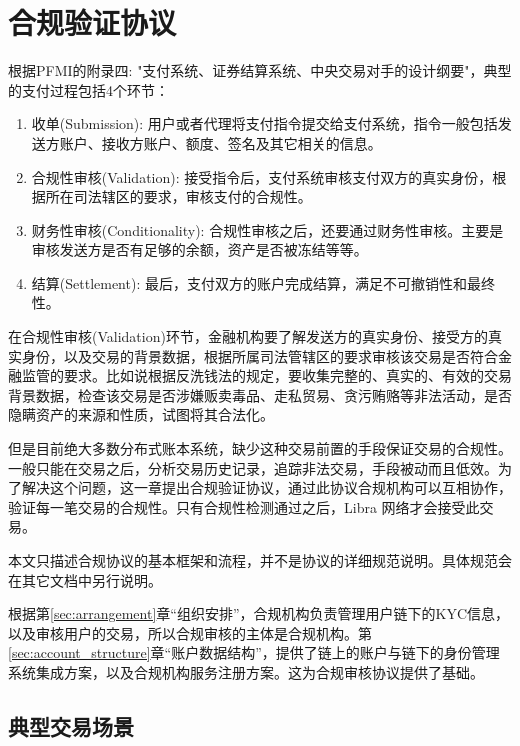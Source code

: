 \section{合规验证协议}\label{sec:compliance}
根据PFMI\cite{pfmi}的附录四: "支付系统、证券结算系统、中央交易对手的设计纲要"，典型的支付过程包括4个环节：
\begin{enumerate}
    \item 收单(Submission): 用户或者代理将支付指令提交给支付系统，指令一般包括发送方账户、接收方账户、额度、签名及其它相关的信息。
    \item 合规性审核(Validation): 接受指令后，支付系统审核支付双方的真实身份，根据所在司法辖区的要求，审核支付的合规性。
    \item 财务性审核(Conditionality): 合规性审核之后，还要通过财务性审核。主要是审核发送方是否有足够的余额，资产是否被冻结等等。
    \item 结算(Settlement): 最后，支付双方的账户完成结算，满足不可撤销性和最终性。
\end{enumerate}

在合规性审核(Validation)环节，金融机构要了解发送方的真实身份、接受方的真实身份，以及交易的背景数据，根据所属司法管辖区的要求审核该交易是否符合金融监管的要求。比如说根据反洗钱法的规定，要收集完整的、真实的、有效的交易背景数据，检查该交易是否涉嫌贩卖毒品、走私贸易、贪污贿赂等非法活动，是否隐瞒资产的来源和性质，试图将其合法化。

但是目前绝大多数分布式账本系统，缺少这种交易前置的手段保证交易的合规性。一般只能在交易之后，分析交易历史记录，追踪非法交易，手段被动而且低效。为了解决这个问题，这一章提出合规验证协议，通过此协议合规机构可以互相协作，验证每一笔交易的合规性。只有合规性检测通过之后，Libra 网络才会接受此交易。

本文只描述合规协议的基本框架和流程，并不是协议的详细规范说明。具体规范会在其它文档中另行说明。

根据第\ref{sec:arrangement}章“组织安排”，合规机构负责管理用户链下的KYC信息，以及审核用户的交易，所以合规审核的主体是合规机构。第\ref{sec:account_structure}章“账户数据结构”，提供了链上的账户与链下的身份管理系统集成方案，以及合规机构服务注册方案。这为合规审核协议提供了基础。

\subsection{典型交易场景}

